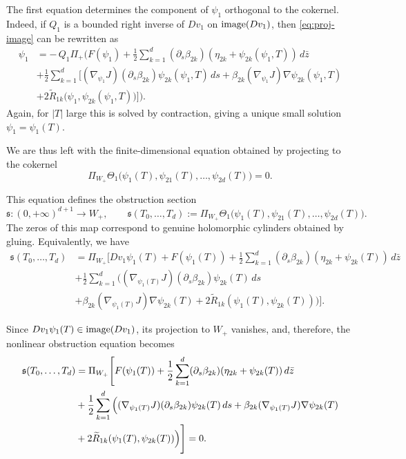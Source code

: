 \documentclass{amsart}
\begin{document}
The first equation determines the component of $\psi_1$ orthogonal to the
cokernel. Indeed, if $Q_1$ is a bounded right inverse of $Dv_1$ on
${\rm image}(Dv_1)$, then \eqref{eq:proj-image} can be rewritten as
$$
\begin{aligned}
    \psi_1
& =
-\,Q_1\Pi_+\Big(
F(\psi_1)
+\frac12\sum_{k=1}^d (\partial_s\beta_{2k})(\eta_{2k}+\psi_{2k}(\psi_1,T))\,d\bar z\\
& 
+\frac12\sum_{k=1}^d
\Big[
(\nabla_{\psi_1}J)(\partial_s\beta_{2k})\psi_{2k}(\psi_1,T)\,ds
+\beta_{2k}(\nabla_{\psi_1}J)\nabla\psi_{2k}(\psi_1,T)
\\& +2\widetilde R_{1k}\bigl(\psi_1,\psi_{2k}(\psi_1,T)\bigr)
\Big]
\Big).
\end{aligned}
$$
Again, for $|T|$ large this is solved by contraction, giving a unique
small solution
$
\psi_1=\psi_1(T).$

We are thus left with the finite-dimensional equation obtained by projecting
to the cokernel
$$
\Pi_{W_+}\Theta_1\bigl(\psi_1(T),\psi_{21}(T),\dots,\psi_{2d}(T)\bigr)=0.
$$

This equation defines the obstruction section
$$
\mathfrak{s}:(0,+\infty)^{d+1}\to W_+,
\qquad
\mathfrak{s}(T_0,\dots,T_d)
:=
\Pi_{W_+}\Theta_1\bigl(\psi_1(T),\psi_{21}(T),\dots,\psi_{2d}(T)\bigr).
$$
The zeros of this map correspond to genuine holomorphic cylinders obtained by gluing.
Equivalently, we have
\begin{align*}
\mathfrak{s}(T_0,\dots,T_d)
&=
\Pi_{W_+}\Bigg[
Dv_1\psi_1(T)+F(\psi_1(T))
+\frac12\sum_{k=1}^d (\partial_s\beta_{2k})(\eta_{2k}+\psi_{2k}(T))\,d\bar z \\
&
+\frac12\sum_{k=1}^d
\Big(
(\nabla_{\psi_1(T)}J)(\partial_s\beta_{2k})\psi_{2k}(T)\,ds\\ & 
+\beta_{2k}(\nabla_{\psi_1(T)}J)\nabla\psi_{2k}(T)
+2\widetilde R_{1k}(\psi_1(T),\psi_{2k}(T))
\Big)
\Bigg].
\end{align*}

Since $Dv_1\psi_1(T)\in {\rm image}(Dv_1)$, its projection to $W_+$ vanishes, and,
therefore, the nonlinear obstruction equation becomes
\begin{align}
\mathfrak{s}(T_0,\dots,T_d)
&=
\Pi_{W_+}\Bigg[
F(\psi_1(T))
+\frac12\sum_{k=1}^d (\partial_s\beta_{2k})(\eta_{2k}+\psi_{2k}(T))\,d\bar z
\notag\\
&
+\frac12\sum_{k=1}^d
\Big(
(\nabla_{\psi_1(T)}J)(\partial_s\beta_{2k})\psi_{2k}(T)\,ds
+\beta_{2k}(\nabla_{\psi_1(T)}J)\nabla\psi_{2k}(T)\\ & 
+2\widetilde R_{1k}(\psi_1(T),\psi_{2k}(T))
\Big)
\Bigg]
=0.
\label{eq:obstruction-section}
\end{align}
\end{document}
